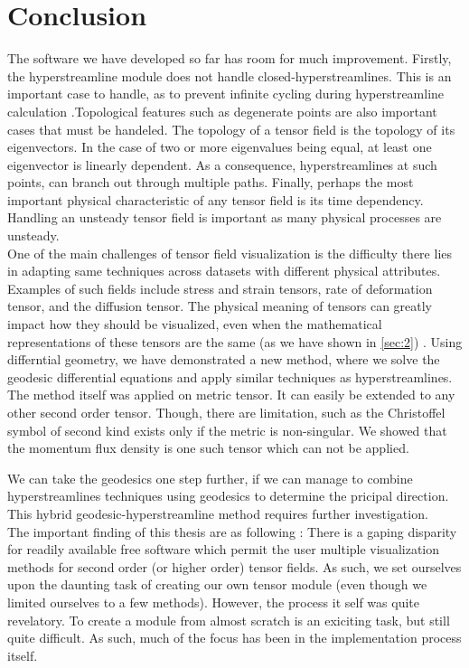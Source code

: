\documentclass[main.tex]{subfiles}
\begin{document}
\section{Conclusion}
\label{sec:6}

The software we have developed so far has room for much improvement. Firstly, the hyperstreamline
module does not handle closed-hyperstreamlines. This is an important case to handle,
as to prevent infinite cycling during hyperstreamline calculation \cite{WM06}.Topological
features such as degenerate points are also important cases that must be handeled. 
The topology of a tensor field is the topology of its eigenvectors. In the case of two or
more eigenvalues being equal, at least one eigenvector
is linearly dependent. As a consequence, hyperstreamlines at such points, can
branch out through multiple paths. Finally, perhaps the most important physical characteristic 
of any tensor field is its time dependency. Handling an unsteady tensor field is 
important as many physical processes are unsteady.
\\

One of the main challenges of tensor field visualization is the difficulty there lies in
adapting same techniques across datasets with different physical attributes. Examples of 
such fields include stress and strain tensors, rate of deformation tensor, and the diffusion 
tensor. The physical meaning of tensors can greatly impact how they should be visualized, 
even when the mathematical representations of these tensors are the same 
(as we have shown in \ref{sec:2}) \cite{HHK14}. Using differntial geometry, we have demonstrated 
a new method, where we solve the geodesic differential equations and apply similar techniques 
as hyperstreamlines. The method itself was applied on metric tensor. It can easily be 
extended to any other second order tensor. Though, there are limitation, such as 
the Christoffel symbol of second kind exists only if the metric is non-singular. We showed
that the momentum flux density is one such tensor which can not be applied. 

We can take the geodesics one step further, if we can manage to combine hyperstreamlines
techniques using geodesics to determine the pricipal direction. This hybrid geodesic-hyperstreamline
method requires further investigation.
\\

The important finding of this thesis are as following : There is a gaping disparity for
readily available free software which permit the user multiple visualization methods for
second order (or higher order) tensor fields. As such, we set ourselves upon the daunting
task of creating our own tensor module (even though we limited ourselves to a few methods).
However, the process it self was quite revelatory. To create a module from almost scratch
is an exiciting task, but still quite difficult. As such, much of the focus has been
in the implementation process itself.
\end{document}
